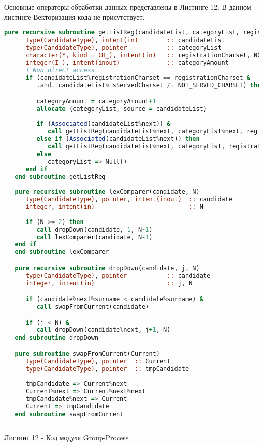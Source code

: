 \documentclass[12pt, a4paper]{report}
\begin{document}
Основные операторы обработки данных представлены в Листинге 12. В данном листинге Векторизация кода не присутствует.
\begin{lstlisting}[language=Fortran]
   pure recursive subroutine getListReg(candidateList, categoryList, registrationCharset, NOT_SERVED_CHARSET, categoryAmount)
      type(CandidateType), intent(in)        :: candidateList
      type(CandidateType), pointer           :: categoryList
      character(*, kind = CH_), intent(in)   :: registrationCharset, NOT_SERVED_CHARSET
      integer(I_), intent(inout)             :: categoryAmount
      ! Non direct access
      if (candidateList%registrationCharset == registrationCharset &
         .and. candidateList%isServedCharset /= NOT_SERVED_CHARSET) then

         categoryAmount = categoryAmount+1
         allocate (categoryList, source = candidateList)
         
         if (Associated(candidateList%next)) &
            call getListReg(candidateList%next, categoryList%next, registrationCharset, NOT_SERVED_CHARSET, categoryAmount)
         else if (Associated(candidateList%next)) then
            call getListReg(candidateList%next, categoryList, registrationCharset, NOT_SERVED_CHARSET, categoryAmount)
         else
            categoryList => Null()
      end if
   end subroutine getListReg
 
   pure recursive subroutine lexComparer(candidate, N)
      type(CandidateType), pointer, intent(inout)  :: candidate
      integer, intent(in)                          :: N
      
      if (N >= 2) then
         call dropDown(candidate, 1, N-1)
         call lexComparer(candidate, N-1)
   end if
   end subroutine lexComparer

   pure recursive subroutine dropDown(candidate, j, N)
      type(CandidateType), pointer           :: candidate
      integer, intent(in)                    :: j, N

      if (candidate%next%surname < candidate%surname) &
         call swapFromCurrent(candidate)

      if (j < N) &
         call dropDown(candidate%next, j+1, N)
   end subroutine dropDown

   pure subroutine swapFromCurrent(Current)
      type(CandidateType), pointer  :: Current
      type(CandidateType), pointer  :: tmpCandidate
               
      tmpCandidate => Current%next                         
      Current%next => Current%next%next                        
      tmpCandidate%next => Current             
      Current => tmpCandidate           
   end subroutine swapFromCurrent
   
\end{lstlisting}
\begin{center}
Листинг 12 - Код модуля Group-Process
\end{center}
\newpage
\end{document}
